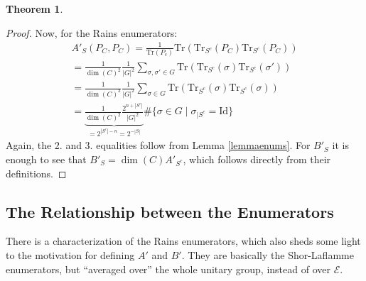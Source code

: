 \documentclass[12pt,a4paper,BCOR15mm,twoside,DIV12]{article}
\def\E{\mathcal{E}}
\def\Tr{\text{Tr}}
\def\Id{\text{Id}}
\theoremstyle{definition}
\newtheorem{theorem}[Satz]{Theorem}
\begin{document}
\begin{theorem}
\begin{proof}
Now, for the Rains enumerators: 
\begin{align*} A'_S(P_C,P_C) = \frac{1}{\Tr(P_c)} \Tr(\Tr_{S^c}(P_C)\Tr_{S^c}(P_C)) \\= \frac{1}{\dim (C)^2} \frac{1}{|G|^2} \sum_{\sigma, \sigma' \in G}  \Tr(\Tr_{S^c}(\sigma)\Tr_{S^c}(\sigma'))
 \\ = \frac{1}{\dim (C)^2} \frac{1}{|G|^2} \sum_{\sigma \in G}  \Tr(\Tr_{S^c}(\sigma)\Tr_{S^c}(\sigma)) \\ = \underbrace{\frac{1}{\dim (C)^2} \frac{2^{n+|S^c|}}{|G|^2}}_{= 2^{|S^c| - n}=2^{-|S|}} \# \{ \sigma \in G \mid \sigma_{\big| S^c} = \Id \} \end{align*}
Again, the 2. and 3. equalities follow from Lemma \ref{lemmaenums}. For $B'_S$ it is enough to see that $B'_{S} = \dim (C) A'_{S^c}$, which follows directly from their definitions.
\end{proof}

\end{theorem}

\subsection{The Relationship between the Enumerators}

There is a characterization of the Rains enumerators, which also sheds some light to the motivation for defining $A'$ and $B'$. 
They are basically the Shor-Laflamme enumerators, but ``averaged over'' the whole unitary group, instead of over $\E$.
\end{document}
